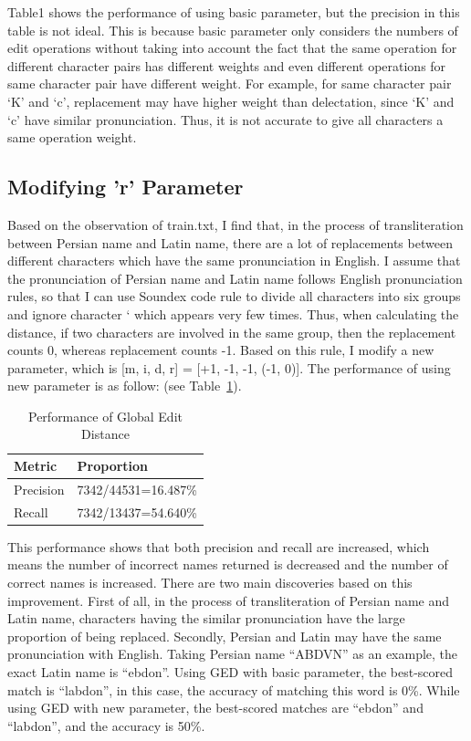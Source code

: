 \documentclass[11pt]{article}
\begin{document}
Table1 shows the performance of using basic parameter, but the precision in this table is not ideal. This is because basic parameter only considers the numbers of edit operations without taking into account the fact that the same operation for different character pairs has different weights and even different operations for same character pair have different weight. For example, for same character pair ‘K’ and ‘c’, replacement may have higher weight than delectation, since ‘K’ and ‘c’ have similar pronunciation. Thus, it is not accurate to give all characters a same operation weight.

 

\subsection{Modifying 'r' Parameter}
Based on the observation of train.txt, I find that, in the process of transliteration between Persian name and Latin name, there are a lot of replacements between different characters which have the same pronunciation in English. I assume that the pronunciation of Persian name and Latin name follows English pronunciation rules, so that I can use Soundex code rule to divide all characters into six groups and ignore character ` which appears very few times. Thus, when calculating the distance, if two characters are involved in the same group, then the replacement counts 0, whereas replacement counts -1. Based on this rule, I modify a new parameter, which is [m, i, d, r] = [+1, -1, -1, (-1, 0)]. The performance of using new parameter is as follow: (see Table~\ref{table2}).

\begin{table}[h]
 \begin{center}
\begin{tabular}{|l|l|}

      \hline
      Metric & Proportion\\
      \hline\hline
      Precision & 7342/44531=16.487\%\\
      Recall & 7342/13437=54.640\%\\
      \hline

\end{tabular}
\caption{Performance of Global Edit Distance}\label{table2}
\end{center}
\end{table}

This performance shows that both precision and recall are increased, which means the number of incorrect names returned is decreased and the number of correct names is increased. There are two main discoveries based on this improvement. First of all, in the process of transliteration of Persian name and Latin name, characters having the similar pronunciation have the large proportion of being replaced. Secondly, Persian and Latin may have the same pronunciation with English. Taking Persian name “ABDVN” as an example, the exact Latin name is “ebdon”. Using GED with basic parameter, the best-scored match is “labdon”, in this case, the accuracy of matching this word is 0\%. While using GED with new parameter, the best-scored matches are “ebdon” and “labdon”, and the accuracy is 50\%. 
\end{document}

